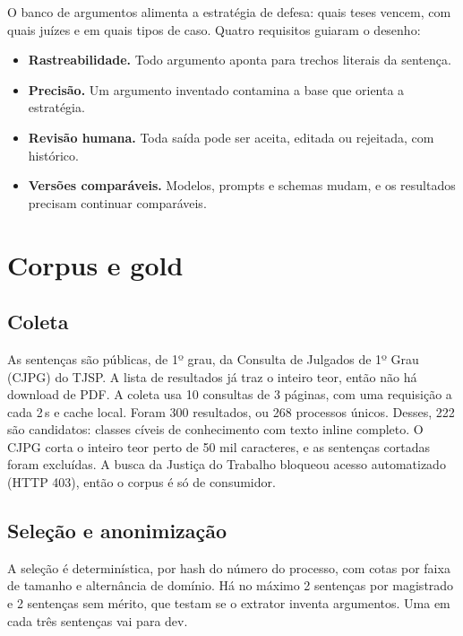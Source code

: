 \documentclass[11pt,a4paper]{article}
\begin{document}
O banco de argumentos alimenta a estratégia de defesa: quais teses vencem, com quais juízes e em
quais tipos de caso. Quatro requisitos guiaram o desenho:
\begin{itemize}
  \item \textbf{Rastreabilidade.} Todo argumento aponta para trechos literais da sentença.
  \item \textbf{Precisão.} Um argumento inventado contamina a base que orienta a estratégia.
  \item \textbf{Revisão humana.} Toda saída pode ser aceita, editada ou rejeitada, com histórico.
  \item \textbf{Versões comparáveis.} Modelos, prompts e schemas mudam, e os resultados precisam
    continuar comparáveis.
\end{itemize}

\section{Corpus e gold}

\subsection{Coleta}

As sentenças são públicas, de 1º grau, da Consulta de Julgados de 1º Grau (CJPG) do TJSP. A lista
de resultados já traz o inteiro teor, então não há download de PDF. A coleta usa 10 consultas de
3 páginas, com uma requisição a cada 2\,s e cache local. Foram 300 resultados, ou 268 processos
únicos. Desses, 222 são candidatos: classes cíveis de conhecimento com texto inline completo. O
CJPG corta o inteiro teor perto de 50 mil caracteres, e as sentenças cortadas foram excluídas.
A busca da Justiça do Trabalho bloqueou acesso automatizado (HTTP 403), então o corpus é só de
consumidor.

\subsection{Seleção e anonimização}

A seleção é determinística, por hash do número do processo, com cotas por faixa de tamanho e
alternância de domínio. Há no máximo 2 sentenças por magistrado e 2 sentenças sem mérito, que
testam se o extrator inventa argumentos. Uma em cada três sentenças vai para dev.
\end{document}
